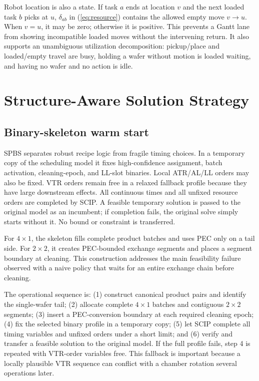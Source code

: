 \documentclass{ifacconf}
\begin{document}
Robot location is also a state. If task $a$ ends at location $v$ and the next loaded task $b$ picks at $u$, $\delta_{ab}$ in (\ref{eq:resource}) contains the allowed empty move $v\rightarrow u$. When $v=u$, it may be zero; otherwise it is positive. This prevents a Gantt lane from showing incompatible loaded moves without the intervening return. It also supports an unambiguous utilization decomposition: pickup/place and loaded/empty travel are busy, holding a wafer without motion is loaded waiting, and having no wafer and no action is idle.

\section{Structure-Aware Solution Strategy}

\subsection{Binary-skeleton warm start}

SPBS separates robust recipe logic from fragile timing choices. In a temporary copy of the scheduling model it fixes high-confidence assignment, batch activation, cleaning-epoch, and LL-slot binaries. Local ATR/AL/LL orders may also be fixed. VTR orders remain free in a relaxed fallback profile because they have large downstream effects. All continuous times and all unfixed resource orders are completed by SCIP. A feasible temporary solution is passed to the original model as an incumbent; if completion fails, the original solve simply starts without it. No bound or constraint is transferred.

For $4\times1$, the skeleton fills complete product batches and uses PEC only on a tail side. For $2\times2$, it creates PEC-bounded exchange segments and places a segment boundary at cleaning. This construction addresses the main feasibility failure observed with a naive policy that waits for an entire exchange chain before cleaning.

The operational sequence is: (1) construct canonical product pairs and identify the single-wafer tail; (2) allocate complete $4\times1$ batches and contiguous $2\times2$ segments; (3) insert a PEC-conversion boundary at each required cleaning epoch; (4) fix the selected binary profile in a temporary copy; (5) let SCIP complete all timing variables and unfixed orders under a short limit; and (6) verify and transfer a feasible solution to the original model. If the full profile fails, step 4 is repeated with VTR-order variables free. This fallback is important because a locally plausible VTR sequence can conflict with a chamber rotation several operations later.
\end{document}
